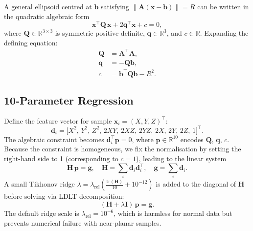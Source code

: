 \documentclass[conference]{IEEEtran}
\begin{document}
    A general ellipsoid centred at $\mathbf{b}$ satisfying
    $\|\mathbf{A}(\mathbf{x}-\mathbf{b})\| = R$ can be written in the
    quadratic algebraic form
    \begin{equation}
        \mathbf{x}^\top \mathbf{Q}\,\mathbf{x}
        + 2\mathbf{q}^\top\mathbf{x} + c = 0,
    \end{equation}
    where $\mathbf{Q} \in \mathbb{R}^{3\times 3}$ is symmetric positive
    definite, $\mathbf{q} \in \mathbb{R}^3$, and $c \in \mathbb{R}$.
    Expanding the defining equation:
    \begin{align}
        \mathbf{Q} &= \mathbf{A}^\top\mathbf{A}, \\
        \mathbf{q} &= -\mathbf{Q}\mathbf{b}, \\
        c &= \mathbf{b}^\top\mathbf{Q}\mathbf{b} - R^2.
    \end{align}

    \subsection{10-Parameter Regression}
    \label{sec:regression}

    Define the feature vector for sample $\mathbf{x}_i = (X,Y,Z)^\top$:
    \begin{equation}
        \mathbf{d}_i = \bigl[X^2,\,Y^2,\,Z^2,\,2XY,\,2XZ,\,2YZ,\,
        2X,\,2Y,\,2Z,\,1\bigr]^\top.
    \end{equation}
    The algebraic constraint becomes $\mathbf{d}_i^\top\mathbf{p} = 0$,
    where $\mathbf{p} \in \mathbb{R}^{10}$ encodes $\mathbf{Q}$, $\mathbf{q}$, $c$.
    Because the constraint is homogeneous, we fix the normalisation by
    setting the right-hand side to 1 (corresponding to $c = 1$), leading
    to the linear system
    \begin{equation}
        \mathbf{H}\,\mathbf{p} = \mathbf{g},
        \quad
        \mathbf{H} = \sum_i \mathbf{d}_i\mathbf{d}_i^\top,
        \quad
        \mathbf{g} = \sum_i \mathbf{d}_i.
        \label{eq:lsq}
    \end{equation}
    A small Tikhonov ridge
    $\lambda = \lambda_\text{rel}\!\left(\tfrac{\mathrm{tr}(\mathbf{H})}{10}
    + 10^{-12}\right)$
    is added to the diagonal of $\mathbf{H}$ before solving via LDLT
    decomposition:
    \begin{equation}
    (\mathbf{H} + \lambda\mathbf{I})\,\mathbf{p} = \mathbf{g}.
    \label{eq:ridge}
    \end{equation}
    The default ridge scale is $\lambda_\text{rel} = 10^{-6}$, which is
    harmless for normal data but prevents numerical failure with
    near-planar samples.
\end{document}
